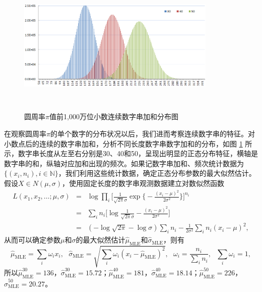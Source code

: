 \begin{example}
\begin{figure}[htbp]
  \centering
  \includegraphics[width=0.85\textwidth, height=6cm]{figures/pisumdist.eps}\\
  \caption{圆周率$\pi$值前1,000万位小数连续数字串加和分布图}\label{fig:pisumdist}
\end{figure}
在观察圆周率$\pi$的单个数字的分布状况以后，我们进而考察连续数字串的特征。对小数点后的连续的数字串加和，分析不同长度数字串数字加和的分布，如图
\ref{fig:pisumdist} 所示，数字串长度从左至右分别是30、40和50，呈现出明显的正态分布特征，横轴是数字串的和，纵轴对应加和出现的频次。如果记数字串加和、频次统计数据为$\{(x_i,n_i),i\in \mathbb N\}$，我们利用这些统计数据，确定正态分布参数的最大似然估计。
假设$X\in N(\mu,\sigma)$，使用固定长度的数字串观测数据建立对数似然函数
\[
\begin{array}{lcl}
    L(x_1,x_2,\ldots; \mu,\sigma) &=& \log \prod\limits_i \big[\frac{1}{\sqrt{2\pi} \sigma} \exp\big\{-\frac{(x_i-\mu)^2}{2\sigma^2}\big\} \big]^{n_i}\\
    & = & \sum\limits_i n_i \big[\log \frac{1}{\sqrt{2\pi} \sigma} - \frac{(x_i-\mu)^2}{2\sigma^2}\big]\\
    & = & (-\log \sqrt{2\pi} - \log\sigma) \sum\limits_i n_i - \frac{1}{2\sigma^2} \sum\limits_i n_i (x_i-\mu)^2,
\end{array}
\]
从而可以确定参数$\mu$和$\sigma$的最大似然估计$\hat \mu_\mathrm{MLE}$和$\hat \sigma_\mathrm{MLE}$，则有
\[
    \hat \mu_\mathrm{MLE} = \sum\limits_i \omega_i x_i,~~~\hat \sigma_\mathrm{MLE} = \sqrt{\sum\limits_i \omega_i (x_i-\hat \mu_\mathrm{MLE})^2},~~~\omega_i = \frac{n_i}{\sum\limits_i n_i},~~~\sum\limits_i \omega_i = 1,
\]
所以$\hat \mu_\mathrm{MLE}^{30}=136$，$\hat \sigma_\mathrm{MLE}^{30}=15.72$；$\hat \mu_\mathrm{MLE}^{40}=181$，$\hat \sigma_\mathrm{MLE}^{40}=18.14$；$\hat \mu_\mathrm{MLE}^{50}=226$，$\hat \sigma_\mathrm{MLE}^{50}=20.27$。
\end{example}

